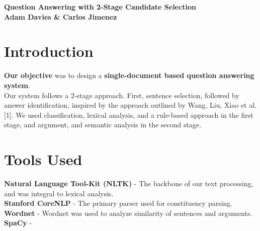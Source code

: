 \documentclass[a1,landscape]{a0poster}
\begin{document}
\begin{minipage}[c]{0.9\linewidth}
\centering
\Huge \color{NavyBlue} \textbf{Question Answering with 2-Stage Candidate Selection} \color{Black}\\ %
\LARGE \textbf{Adam Davies \& Carlos Jimenez}\\ %
\end{minipage}

\vspace{1cm} %


\begin{multicols}{3} %
\Large

\color{SaddleBrown} %

\section*{\LARGE Introduction}
\textbf{Our objective} was to design a \textbf{single-document based question answering system}.\\
Our system follows a 2-stage approach. First, sentence selection, followed by answer identification, inspired by the approach outlined by Wang, Liu, Xiao et al.[1]. We used classification, lexical analysis, and a rule-based approach in the first stage, and argument, and semantic analysis in the second stage.

\color{DarkSlateGray} %

\section*{\LARGE Tools Used}
\textbf{Natural Language Tool-Kit (NLTK)} - The backbone of our text processing, and was integral to lexical analysis. \\
\textbf{Stanford CoreNLP} - The primary parser used for constituency parsing.\\
\textbf{Wordnet} - Wordnet was used to analyze similarity of sentences and arguments. \\
\textbf{SpaCy} - 



\end{multicols}
\end{document}
